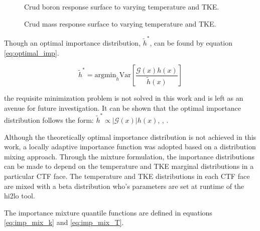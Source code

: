 \begin{figure}[H]%
    \centering
    \qquad
    \caption[]{Crud boron response surface to varying temperature and TKE.}%
    \label{fig:crud_sensi2}%
\end{figure}

\begin{figure}[H]%
    \centering
    \qquad
    \caption[]{Crud mass response surface to varying temperature and TKE.}%
    \label{fig:crud_sensi3}%
\end{figure}


Though an optimal importance distribution, $\tilde{h}^* $, can be found by equation \ref{eq:optimal_imp}.

\begin{equation}
\tilde{h}^* = \mathrm{argmin}_{\tilde{h}}\mathrm{Var} \left[ \frac{\mathcal{G}(x)h(x)}{\tilde{h}(x)} \right] 
\label{eq:optimal_imp}
\end{equation}

the requisite minimization problem is not solved in this work and is left as an avenue for future investigation. It can be shown that the optimal importance distribution follows the form: $\tilde{h}^* \propto |\mathcal{G}(x)|h(x)$, \cite{rubinstein2011}, \cite{mcbook}.

Although the theoretically optimal importance distribution is not achieved in this work, a locally adaptive importance function was adopted based on a distribution mixing approach.  Through the mixture formulation, the importance distributions can be made to depend on the temperature and TKE marginal distributions in a particular CTF face.  The temperature and TKE distributions in each CTF face are mixed with a beta distribution who's parameters are set at runtime of the hi2lo tool.  

The importance  mixture quantile functions are defined in equations \ref{eq:imp_mix_k} and \ref{eq:imp_mix_T}.

